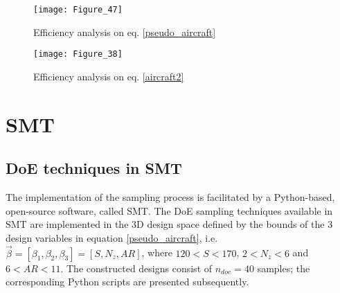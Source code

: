 \newpage

\begin{figure}[h!]
    \centering
    \texttt{[image: Figure\_47]}
    \caption{Efficiency analysis on eq. \ref{pseudo_aircraft}}
\end{figure}

\begin{figure}[h!]
    \centering
    \texttt{[image: Figure\_38]}
    \caption{Efficiency analysis on eq. 
    \ref{aircraft2}}
\end{figure}

\newpage

\chapter{SMT}

\section{DoE techniques in SMT}
The implementation of the sampling process is facilitated by a 
Python-based, open-source software, called SMT. The DoE sampling 
techniques available in SMT are implemented in the 3D design space 
defined by the bounds of the 3 design variables in equation 
\ref{pseudo_aircraft}, i.e. $\vec{β}= [β_{1}, β_{2}, β_{3}] 
\!= \![S,N_{z},AR]$, where $120 < S < 170$, $2 < N_{z} < 6$ and 
$6 < AR < 11$. The constructed designs consist of $n_{doe} \!= 
\!40$ samples; the corresponding Python scripts are presented 
subsequently.

